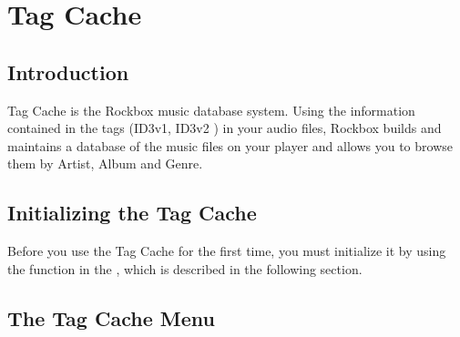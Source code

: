 \section{\label{ref:tagcache}Tag Cache} 

\subsection{Introduction}
Tag Cache is the Rockbox music database system. Using the information
contained in the tags (ID3v1, ID3v2%
) in your audio files, Rockbox builds and maintains a database of the music
files on your player and allows you to browse them by Artist, Album and Genre.

\subsection{Initializing the Tag Cache}
Before you use the Tag Cache for the first time, you must initialize it by using
the  function in the , which is
described in the following section.

\subsection{\label{ref:tagcachemenu}The Tag Cache Menu}

